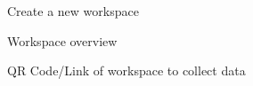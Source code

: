 \begin{figure}[ht]
    \centering
    \caption{Create a new workspace}
    \label{fig:create-workspace}
\end{figure}

\begin{figure}[ht]
    \centering
    \caption{Workspace overview}
    \label{fig:workspace-overview}
\end{figure}

\begin{figure}[ht]
    \centering
    \caption{QR Code/Link of workspace to collect data}
    \label{fig:workspace-link}
\end{figure}

